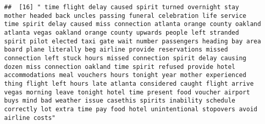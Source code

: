 \documentclass[
]{article}
\begin{document}
\begin{verbatim}
##  [16] " time flight delay caused spirit turned overnight stay mother headed back uncles passing funeral celebration life service time spirit delay caused miss connection atlanta orange county oakland atlanta vegas oakland orange county upwards people left stranded spirit pilot elected taxi gate wait number passengers heading bay area board plane literally beg airline provide reservations missed connection left stuck hours missed connection spirit delay causing dozen miss connection oakland time spirit refused provide hotel accommodations meal vouchers hours tonight year mother experienced thing flight left hours late atlanta considered caught flight arrive vegas morning leave tonight hotel time present food voucher airport buys mind bad weather issue casethis spirits inability schedule correctly lot extra time pay food hotel unintentional stopovers avoid airline costs"                                                                                                                                                                                                                                                                                                                                                                                                                                                                                                                                                                                                                                                                                                                                                                                                                                                                                     

\end{verbatim}
\end{document}
